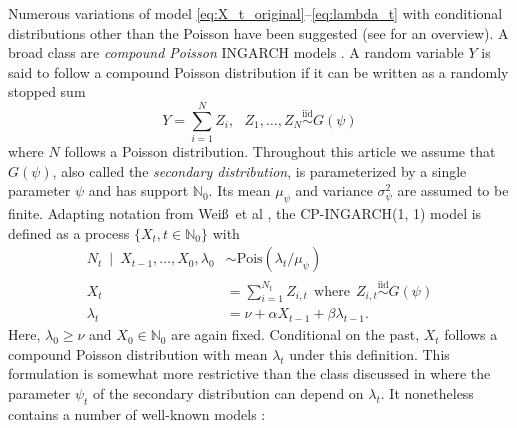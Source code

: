 \documentclass[review]{elsarticle}
\begin{document}
Numerous variations of model \eqref{eq:X_t_original}--\eqref{eq:lambda_t} with conditional distributions other than the Poisson have been suggested (see \cite{Weiss2018} for an overview). A broad class are \textit{compound Poisson} INGARCH models \cite{Goncalves2015, Silva2016}. A random variable $Y$ is said to follow a compound Poisson distribution \cite[Chapter 3]{Feller1968} if it can be written as a randomly stopped sum 
$$
Y = \sum_{i = 1}^N Z_i, \ \ \ Z_1, \dots, Z_N \stackrel{\text{iid}}{\sim} G(\psi)
$$
where $N$ follows a Poisson distribution. Throughout this article we assume that $G(\psi)$, also called the \textit{secondary distribution}, is parameterized by a single parameter $\psi$ and has support $\mathbb{N}_0$. Its mean $\mu_\psi$ and variance $\sigma^2_\psi$ are assumed to be finite. Adapting notation from Wei\ss\ et al \cite[Sec. 2]{Weiss2017}, the CP-INGARCH(1, 1) model is defined as a process $\{X_t, t \in \mathbb{N}_0\}$ with %
\begin{align}
N_t \ \mid \ X_{t - 1}, \dots, X_0, \lambda_0 & \sim \text{Pois}(\lambda_t/\mu_\psi) \label{eq:N_CP_original}\\
X_t & = \sum_{i = 1}^{N_t} Z_{i, t} \ \ \text{where} \ \  Z_{i, t} \stackrel{\text{iid}}{\sim} G(\psi)\label{eq:X_CP_original}\\
\lambda_t & = \nu + \alpha X_{t - 1} + \beta \lambda_{t - 1}.\label{eq:lambda_CP_original}
\end{align}
Here, $\lambda_0 \geq \nu$ and $X_0 \in \mathbb{N}_0$ are again fixed. Conditional on the past, $X_t$ follows a compound Poisson distribution with mean $\lambda_t$ under this definition. %
This formulation is somewhat more restrictive than the class discussed in \citep{Goncalves2015} where the parameter $\psi_t$ of the secondary distribution can depend on $\lambda_t$. It nonetheless contains a number of well-known models \cite[Observation 2]{Goncalves2015}:
\end{document}
